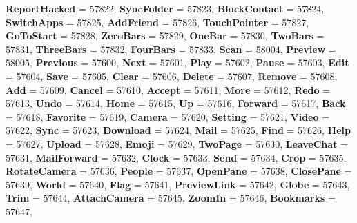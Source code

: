 \begin{DoxyCompactItemize}
{\bfseries Report\+Hacked} = 57822, 
{\bfseries Sync\+Folder} = 57823, 
{\bfseries Block\+Contact} = 57824, 
\newline
{\bfseries Switch\+Apps} = 57825, 
{\bfseries Add\+Friend} = 57826, 
{\bfseries Touch\+Pointer} = 57827, 
{\bfseries Go\+To\+Start} = 57828, 
\newline
{\bfseries Zero\+Bars} = 57829, 
{\bfseries One\+Bar} = 57830, 
{\bfseries Two\+Bars} = 57831, 
{\bfseries Three\+Bars} = 57832, 
\newline
{\bfseries Four\+Bars} = 57833, 
{\bfseries Scan} = 58004, 
{\bfseries Preview} = 58005, 
{\bfseries Previous} = 57600, 
\newline
{\bfseries Next} = 57601, 
{\bfseries Play} = 57602, 
{\bfseries Pause} = 57603, 
{\bfseries Edit} = 57604, 
\newline
{\bfseries Save} = 57605, 
{\bfseries Clear} = 57606, 
{\bfseries Delete} = 57607, 
{\bfseries Remove} = 57608, 
\newline
{\bfseries Add} = 57609, 
{\bfseries Cancel} = 57610, 
{\bfseries Accept} = 57611, 
{\bfseries More} = 57612, 
\newline
{\bfseries Redo} = 57613, 
{\bfseries Undo} = 57614, 
{\bfseries Home} = 57615, 
{\bfseries Up} = 57616, 
\newline
{\bfseries Forward} = 57617, 
{\bfseries Back} = 57618, 
{\bfseries Favorite} = 57619, 
{\bfseries Camera} = 57620, 
\newline
{\bfseries Setting} = 57621, 
{\bfseries Video} = 57622, 
{\bfseries Sync} = 57623, 
{\bfseries Download} = 57624, 
\newline
{\bfseries Mail} = 57625, 
{\bfseries Find} = 57626, 
{\bfseries Help} = 57627, 
{\bfseries Upload} = 57628, 
\newline
{\bfseries Emoji} = 57629, 
{\bfseries Two\+Page} = 57630, 
{\bfseries Leave\+Chat} = 57631, 
{\bfseries Mail\+Forward} = 57632, 
\newline
{\bfseries Clock} = 57633, 
{\bfseries Send} = 57634, 
{\bfseries Crop} = 57635, 
{\bfseries Rotate\+Camera} = 57636, 
\newline
{\bfseries People} = 57637, 
{\bfseries Open\+Pane} = 57638, 
{\bfseries Close\+Pane} = 57639, 
{\bfseries World} = 57640, 
\newline
{\bfseries Flag} = 57641, 
{\bfseries Preview\+Link} = 57642, 
{\bfseries Globe} = 57643, 
{\bfseries Trim} = 57644, 
\newline
{\bfseries Attach\+Camera} = 57645, 
{\bfseries Zoom\+In} = 57646, 
{\bfseries Bookmarks} = 57647, 

\end{DoxyCompactItemize}
